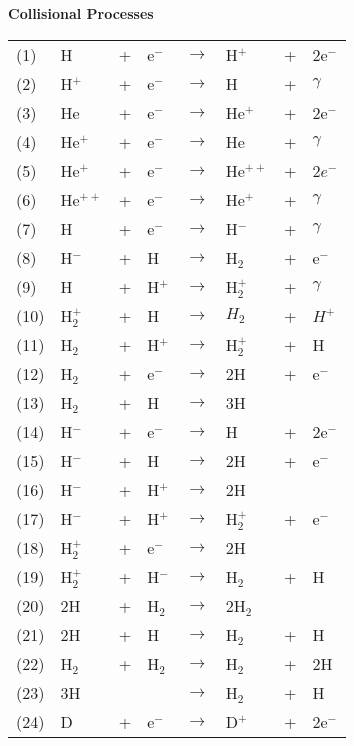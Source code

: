 \begin{table}
\begin{center}
{\bfseries Collisional Processes}\\[1ex]
\begin{tabular}{llllllll}
(1) & H & + & e$^-$ & $\rightarrow$ & H$^+$ &+& 2e$^-$ \\
(2) & H$^+$ &+ &e$^-$ & $\rightarrow$ & H &+ &$\gamma$ \\
(3) & He &+& e$^-$ & $\rightarrow$ & He$^+$ &+& 2e$^-$  \\
(4) & He$^+$ &+& e$^-$ & $\rightarrow$ & He &+ &$\gamma$  \\
(5) & He$^{+}$ &+& e$^-$ & $\rightarrow$ & He$^{++}$ &+& 2$e^-$  \\
(6) & He$^{++}$ &+& e$^-$ & $\rightarrow$ & He$^+$ &+& $\gamma$ \\
\hline
(7) & H &+& e$^-$ &$\rightarrow$& H$^-$ &+& $\gamma$  \\
(8) & H$^-$ &+& H &$\rightarrow$ & H$_2$ & +& e$^-$ \\
(9) & H &+ &H$^+$ &$\rightarrow$ &H$_2^+$ &+ &$\gamma$ \\
(10) & H$_2^+$ &+ &H &$\rightarrow$ &$H_2$ &+ &$H^+$ \\
(11) & H$_2$ &+ &H$^+$ &$\rightarrow$ &H$_2^+$ & +& H \\
(12) & H$_2$ &+ &e$^-$ & $\rightarrow$ & 2H & + & e$^-$  \\
(13) & H$_2$ & + & H & $\rightarrow$ & 3H &   &      \\
(14) & H$^-$ & + & e$^-$ & $\rightarrow$ & H & + & 2e$^-$ \\
(15) & H$^-$ & + & H & $\rightarrow$ & 2H & + & e$^-$ \\ 
(16) & H$^-$ & + & H$^+$ & $\rightarrow$ & 2H & & \\
(17) & H$^-$ & + & H$^+$ & $\rightarrow$ & H$_2^+$ & + & e$^-$ \\
(18) & H$_2^+$ & + & e$^-$ & $\rightarrow$ & 2H & & \\
(19) & H$_2^+$ & + & H$^-$ & $\rightarrow$ & H$_2$ & + & H  \\
(20) & 2H & + & H$_2$ & $\rightarrow$ & 2H$_2$ &  &   \\
(21) & 2H & + & H & $\rightarrow$ & H$_2$ & + & H  \\
(22) & H$_2$ & + & H$_2$ & $\rightarrow$ & H$_2$ & + & 2H  \\
(23) & 3H & & & $\rightarrow$ & H$_2$ & + & H \\
\hline
(24) & D & + & e$^-$ & $\rightarrow$ & D$^+$ &+& 2e$^-$ \\

\end{tabular}
\end{center}
\end{table}
